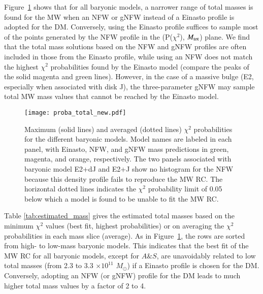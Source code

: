 \documentclass{aa}
\begin{document}
Figure~\ref{fig:proba_tot} shows that for all baryonic models, a narrower range of total masses is found for the MW when an NFW or gNFW instead of a Einasto profile is adopted for the DM. Conversely, using the Einasto profile suffices to sample most of the points generated by the NFW profile in the (P($\chi^2$), $M_{\rm tot}$) plane. We find that the total mass solutions based on the NFW  and gNFW profiles are often included in those from the Einasto profile, while using an NFW does not match the highest $\chi^2$ probabilities found by the Einasto model (compare the peaks of the solid magenta and green lines). However, in the case of a massive bulge (E2, especially when associated with disk J), the three-parameter gNFW may sample total MW mass values that cannot be reached by the Einasto model.

\begin{figure}
\texttt{[image: proba\_total\_new.pdf]}
    \caption{Maximum (solid lines) and averaged (dotted lines) $\chi^2$ probabilities for the different baryonic models. Model names are labeled in each panel, with Einasto, NFW, and gNFW mass predictions in green, magenta, and orange, respectively. The two panels associated with baryonic model E2+dJ and E2+J show no histogram for the NFW because this density profile fails to reproduce the MW RC. The horizontal dotted lines indicates the $\chi^2$ probability limit of 0.05 below which a model is found to be unable to fit the MW RC.}
    \label{fig:proba_tot}
\end{figure}



Table \ref{tab:estimated_mass} gives the estimated total masses based on the minimum $\chi^2$ values (best fit, highest probabilities) or on averaging the $\chi^2$ probabilities in each mass slice (average). As in Figure~\ref{fig:proba_tot}, the rows are sorted from high- to low-mass baryonic models. This indicates that the best fit of the MW RC for all baryonic models, except for $A\&S$, are unavoidably related to low total masses (from 2.3 to 3.3 $\times 10^{11}$ $M_{\odot}$) if a Einasto profile is chosen for the DM. Conversely, adopting an NFW (or gNFW) profile for the DM leads to much higher total mass values by a factor of 2 to 4. %
\end{document}
